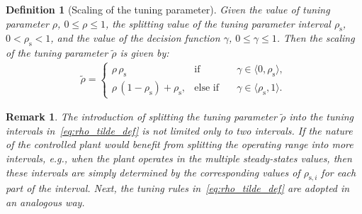 \documentclass[preprint,12pt]{elsarticle}
\newtheorem{remark}[theorem]{Remark}
\newtheorem{definition}{Definition}[section]
\begin{document}
	\begin{definition}[Scaling of the tuning parameter]
		\label{def:rho_tilde}
		Given the value of tuning parameter $\rho$, $0 \leq \rho \leq 1$, the splitting value of the tuning parameter interval $\rho_{\mathrm{s}}$, $0 < \rho_{\mathrm{s}} < 1$, and the value of the decision function $\gamma$, $0 \leq \gamma \leq 1$. Then the scaling of the tuning parameter $\widetilde{\rho}$ is given by:		
		\begin{eqnarray}
			\label{eq:rho_tilde_def}
			\widetilde{\rho} = \left\{ 
			\begin{matrix}
				\rho \, \rho_{\mathrm{s}} & \mathrm{if} & \quad \gamma \in \langle 0, \rho_{\mathrm{s}} \rangle , \\
				\rho \, (1-\rho_{\mathrm{s}}) + \rho_{\mathrm{s}}, & \mathrm{else}\,\,\mathrm{if} &\quad \gamma \in \langle \rho_{\mathrm{s}}, 1 \rangle.
			\end{matrix}
			\right.
		\end{eqnarray}
	\end{definition}
	
	
	
	\begin{remark}
		\label{rem:rho_tilde}		
		The introduction of splitting the tuning parameter $\widetilde{\rho}$ into the tuning intervals in~\eqref{eq:rho_tilde_def} is not limited only to two intervals. If the nature of the controlled plant would benefit from splitting the operating range into more intervals, e.g., when the plant operates in the multiple steady-states values, then these intervals are simply determined by the corresponding values of $\rho_{\mathrm{s}, i}$ for each part of the interval. Next, the tuning rules in~\eqref{eq:rho_tilde_def} are adopted in an analogous way.
	\end{remark}
	
\end{document}
